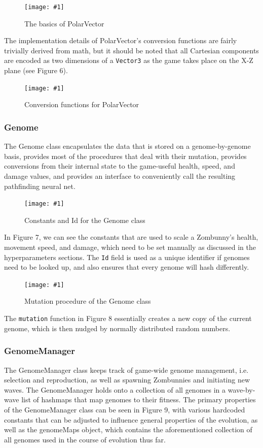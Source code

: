 \documentclass[letterpaper]{article}
\def\imfig#1#2{\begin{figure}[h] \centering \texttt{[image: \#1]} \caption{#2} \end{figure}}
\def\imfigB#1#2{\begin{figure} \centering \texttt{[image: \#1]} \caption{#2} \end{figure}}
\begin{document}
\imfigB{PolarVector1}{The basics of PolarVector}

The implementation details of PolarVector's conversion functions are fairly
trivially derived from math, but it should be noted that all Cartesian
components are encoded as two dimensions of a \texttt{Vector3} as the game takes
place on the X-Z plane (see Figure 6).

\imfigB{PolarVector2}{Conversion functions for PolarVector}

\subsubsection{Genome}
The Genome class encapsulates the data that is stored on a genome-by-genome
basis, provides most of the procedures that deal with their mutation, provides
conversions from their internal state to the game-useful health, speed, and
damage values, and provides an interface to conveniently call the resulting
pathfinding neural net.

\imfigB{Genome1}{Constants and Id for the Genome class}

In Figure 7, we can see the constants that are used to scale a Zombunny's
health, movement speed, and damage, which need to be set manually as discussed
in the hyperparameters sections. The \texttt{Id} field is used as a unique identifier if
genomes need to be looked up, and also ensures that every genome will hash differently.

\imfig{Mutation}{Mutation procedure of the Genome class}

The \texttt{mutation} function in Figure 8 essentially creates a new copy of the current genome, which is then nudged by normally distributed random numbers.

\subsubsection{GenomeManager}

The GenomeManager class keeps track of game-wide genome management, i.e. selection and reproduction, as well as spawning Zombunnies and initiating new waves. The GenomeManager holds onto a collection of all genomes in a wave-by-wave list of hashmaps that map genomes to their fitness. The primary properties of the GenomeManager class can be seen in Figure 9, with various hardcoded constants that can be adjusted to influence general properties of the evolution, as well as the genomeMaps object, which contains the aforementioned collection of all genomes used in the course of evolution thus far.
\end{document}
